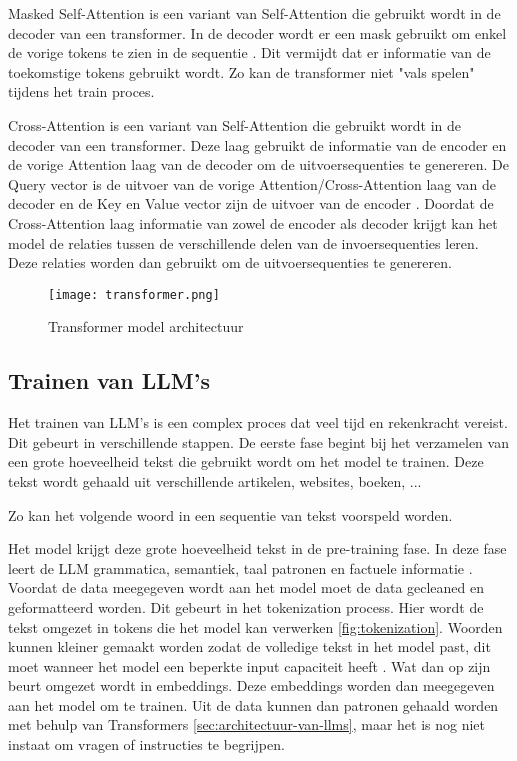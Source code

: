 Masked Self-Attention is een variant van Self-Attention die gebruikt wordt in de decoder van een transformer.
In de decoder wordt er een mask gebruikt om enkel de vorige tokens te zien in de sequentie \autocite{VaswaniEtAl2017}.
Dit vermijdt dat er informatie van de toekomstige tokens gebruikt wordt. 
Zo kan de transformer niet "vals spelen" tijdens het train proces.

Cross-Attention is een variant van Self-Attention die gebruikt wordt in de decoder van een transformer.
Deze laag gebruikt de informatie van de encoder en de vorige Attention laag van de decoder om de uitvoersequenties te genereren.
De Query vector is de uitvoer van de vorige Attention/Cross-Attention laag van de decoder en de Key en Value vector zijn de uitvoer van de encoder \autocite{VaswaniEtAl2017}.
Doordat de Cross-Attention laag informatie van zowel de encoder als decoder krijgt kan het model de relaties tussen de verschillende delen van de invoersequenties leren.
Deze relaties worden dan gebruikt om de uitvoersequenties te genereren.

\begin{figure}[h]
  \centering
  \texttt{[image: transformer.png]}
  \caption[Architectuur transformer model]{Transformer model architectuur \autocite{VaswaniEtAl2017}}
  \label{fig:transformer-model}
\end{figure}

\subsection{Trainen van LLM's}
\label{sec:trainen-van-llms}
Het trainen van LLM's is een complex proces dat veel tijd en rekenkracht vereist. Dit gebeurt in verschillende stappen.
De eerste fase begint bij het verzamelen van een grote hoeveelheid tekst die gebruikt wordt om het model te trainen.
Deze tekst wordt gehaald uit verschillende artikelen, websites, boeken, ... 

Zo kan het volgende woord in een sequentie van tekst voorspeld worden.

Het model krijgt deze grote hoeveelheid tekst in de pre-training fase.
In deze fase leert de LLM grammatica, semantiek, taal patronen en factuele informatie \autocite{Cacic2023}.
Voordat de data meegegeven wordt aan het model moet de data gecleaned en geformatteerd worden.
Dit gebeurt in het tokenization process. Hier wordt de tekst omgezet in tokens die het model kan verwerken \ref{fig:tokenization}.
Woorden kunnen kleiner gemaakt worden zodat de volledige tekst in het model past, dit moet wanneer het model een beperkte input capaciteit heeft \autocite{ElHousieny2023}.
Wat dan op zijn beurt omgezet wordt in embeddings. Deze embeddings worden dan meegegeven aan het model om te trainen.
Uit de data kunnen dan patronen gehaald worden met behulp van Transformers \ref{sec:architectuur-van-llms}, maar het is nog niet instaat om vragen of instructies te begrijpen.


